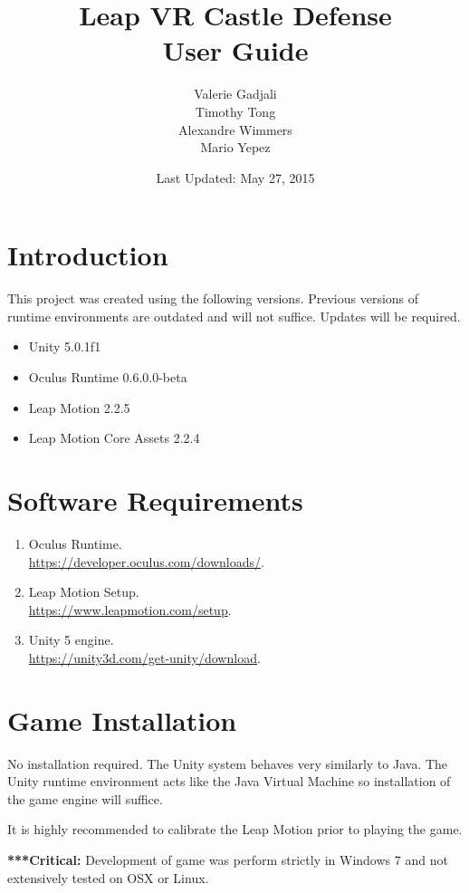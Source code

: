 \documentclass[a4paper]{refart}
\title{Leap VR Castle Defense\\User Guide}
\author{Valerie Gadjali\\
	Timothy Tong\\
	Alexandre Wimmers\\
	Mario Yepez
}
\date{Last Updated: May 27, 2015}
\begin{document}
\maketitle

\tableofcontents

\newpage

\section{Introduction}

This project was created using the following versions. Previous versions of runtime environments are outdated and will not suffice. Updates will be required.

\begin{itemize}
	\item Unity 5.0.1f1
	\item Oculus Runtime 0.6.0.0-beta
	\item Leap Motion 2.2.5
	\item Leap Motion Core Assets 2.2.4
\end{itemize}

\section{Software Requirements}

\begin{enumerate}
	\item Oculus Runtime.\\ \url{https://developer.oculus.com/downloads/}.
	\item Leap Motion Setup.\\ \url{https://www.leapmotion.com/setup}.
	\item Unity 5 engine.\\ \url{https://unity3d.com/get-unity/download}.
\end{enumerate}

\section{Game Installation}

No installation required. The Unity system behaves very similarly to Java. The Unity runtime environment acts like the Java Virtual Machine so installation of the game engine will suffice. 

It is highly recommended to calibrate the Leap Motion prior to playing the game.

\textbf{***Critical:} Development of game was perform strictly in Windows 7 and not extensively tested on OSX or Linux.
\end{document}
